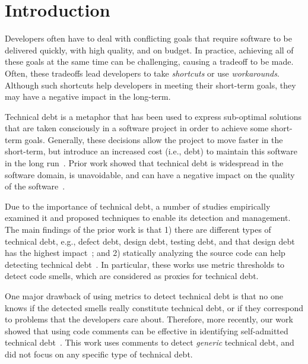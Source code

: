 \documentclass[conference]{IEEEtran}
\newcommand{\emad}[1]{\textcolor{red}{{\it [Emad: #1]}}}
\newcommand{\everton}[1]{\textcolor{blue}{{\it [Everton: #1]}}}
\begin{document}
\IEEEpeerreviewmaketitle

\section{Introduction}
Developers often have to deal with conflicting goals that require software to be delivered quickly, with high quality, and on budget. In practice, achieving all of these goals at the same time can be challenging, causing a tradeoff to be made. Often, these tradeoffs lead developers to take \emph{shortcuts} or use \emph{workarounds}. Although such shortcuts help developers in meeting their short-term goals, they may have a negative impact in the long-term.

Technical debt is a metaphor that has been used to express sub-optimal solutions that are taken consciously in a software project in order to achieve some short-term goals. Generally, these decisions allow the project to move faster in the short-term, but introduce an increased cost (i.e., debt) to maintain this software in the long run~\cite{Seaman2011,Kruchten2013IWMTD}. Prior work showed that technical debt is widespread in the software domain, is unavoidable, and can have a negative impact on the quality of the software~\cite{Lim2012Software}.

Due to the importance of technical debt, a number of studies empirically examined it and proposed techniques to enable its detection and management. The main findings of the prior work is that 1) there are different types of technical debt, e.g., defect debt, design debt, testing debt, and that design debt has the highest impact~\cite{Alves2014MTD,Marinescu2012IBM}; and 2) statically analyzing the source code can help detecting technical debt~\cite{Marinescu2004ICSM,Marinescu2010CSMR,Zazworka2013CSE}. In particular, these works use metric thresholds to detect code smells, which are considered as proxies for technical debt. 

One major drawback of using metrics to detect technical debt is that no one knows if the detected smells really constitute technical debt, or if they correspond to problems that the developers care about. Therefore, more recently, our work showed that using code comments can be effective in identifying self-admitted technical debt~\cite{Potdar2014ICSME}. This work uses comments to detect \emph{generic} technical debt, and did not focus on any specific type of technical debt.
\end{document}
